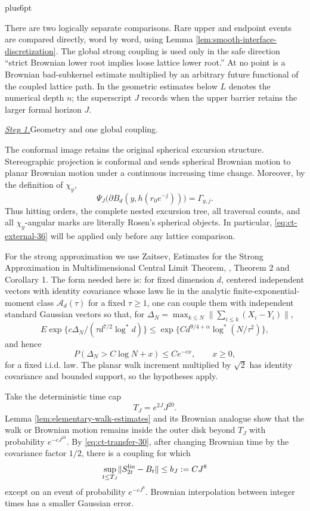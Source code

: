 \documentclass[12pt,reqno]{amsart}
\makeatletter
\theoremstyle{plain}
\theoremstyle{definition}
\theoremstyle{remark}
\renewenvironment{proof}[1][\proofname]{%
  \par
  \pushQED{\qed}%
  \normalfont
  \topsep6pt plus6pt\relax
  \trivlist
  \item[\hskip\labelsep\slshape #1\@addpunct{.}]%
  \ignorespaces
}{%
  \popQED
  \endtrivlist
  \@endpefalse
}
\DeclareRobustCommand{\qed}{%
  \leavevmode\unskip\penalty9999\hbox{}\nobreak
  \ifmmode
    \makebox[0pt][l]{\qquad\hbox{\qedsymbol}}%
  \else
    \qquad\hbox{\qedsymbol}%
  \fi
}
\renewcommand{\qedsymbol}{\rule[.47pt]{4pt}{6pt}}
\numberwithin{equation}{section}
\makeatother
\begin{document}
\begin{proof}[Proof of Lemma~\ref{lem:buffered-transfer}]
There are two logically separate comparisons.  Rare upper and endpoint
events are compared directly, word by word, using Lemma
\ref{lem:smooth-interface-discretization}.  The global strong coupling is used
only in the safe direction ``strict Brownian lower root implies loose
lattice lower root.''  At no point is a Brownian bad-subkernel estimate
multiplied by an arbitrary future functional of the coupled lattice path.
In the geometric estimates below $L$ denotes the numerical depth $n$;
the superscript $J$ records when the upper barrier retains the larger
formal horizon $J$.

\smallskip\noindent
\underline{\textit{Step 1.}}\quad Geometry and one global coupling.

The conformal image retains the original spherical excursion structure.  Stereographic
projection is conformal and sends spherical Brownian motion to planar
Brownian motion under a continuous increasing time change.  Moreover,
by the definition of $\chi_y$,
\[
\Psi_J\bigl(\partial B_d(y,h(r_0e^{-j}))\bigr)
       =\Gamma_{y,j}.
\]
Thus hitting orders, the complete nested excursion tree, all traversal
counts, and all $\chi_y$-angular marks are literally Rosen's spherical
objects.  In particular, \eqref{eq:ct-external-36} will be applied only before any lattice
comparison.

For the strong approximation we use Zaitsev, Estimates for the Strong
Approximation in Multidimensional Central Limit Theorem,
\cite{Zaitsev2003},
Theorem 2 and Corollary 1.  The form needed here is: for fixed
dimension $d$, centered independent vectors with identity covariance
whose laws lie in the analytic finite-exponential-moment class
$\mathcal{A}_d(\tau)$ for a fixed $\tau\ge1$, one can couple them with independent standard
Gaussian vectors so that, for
$\Delta_N=\max_{k\le N}\lVert\sum_{i\le k}(X_i-Y_i)\rVert$,
\[
E\exp\{c\Delta_N/(\tau d^{7/2}\log^*d)\}
 \le \exp\{C d^{9/4+\alpha}\log^*(N/\tau^2)\},
\]
and hence
\begin{equation}
P(\Delta_N>C\log N+x)\le C e^{-cx},\qquad x\ge0,\label{eq:ct-transfer-30}
\end{equation}
for a fixed i.i.d. law.  The planar walk increment multiplied by $\sqrt2$
has identity covariance and bounded support, so the hypotheses apply.

Take the deterministic time cap
\[
T_J=e^{2J}J^{20}.
\]
Lemma \ref{lem:elementary-walk-estimates} and its Brownian analogue show that
the walk or Brownian motion remains inside the outer disk beyond $T_J$
with probability $e^{-cJ^{10}}$.  By \eqref{eq:ct-transfer-30}, after changing Brownian time
by the covariance factor $1/2$, there is a coupling for which
\begin{equation}
\sup_{t\le T_J}\lVert S^{\rm lin}_{2t}-B_t\rVert
       \le b_J:=CJ^8\label{eq:ct-transfer-31}
\end{equation}
except on an event of probability $e^{-cJ^8}$.  Brownian interpolation
between integer times has a smaller Gaussian error.


\end{proof}
\end{document}
